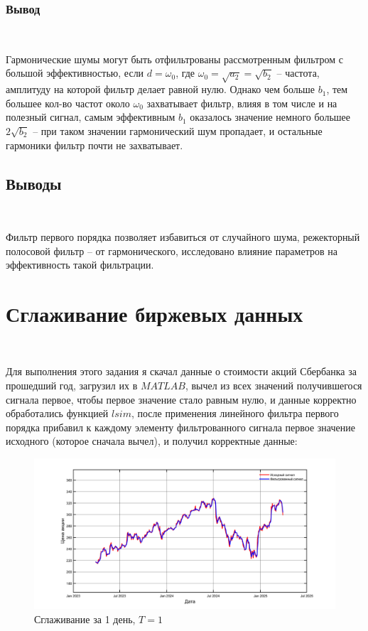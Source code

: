 \documentclass[a4paper]{article}
\begin{document}
\subsubsection{Вывод}\

Гармонические шумы могут быть отфильтрованы рассмотренным фильтром с большой эффективностью, если $d = \omega_0$, где $\omega_0 = \sqrt{a_2} = \sqrt{b_2}$ -- частота, амплитуду на которой фильтр делает равной нулю. Однако чем больше $b_1$, тем большее кол-во частот около $\omega_0$ захватывает фильтр, влияя в том числе и на полезный сигнал, самым эффективным $b_1$ оказалось значение немного большее $2\sqrt{b_2}$ -- при таком значении гармонический шум пропадает, и остальные гармоники фильтр почти не захватывает.

\subsection{Выводы}\

Фильтр первого порядка позволяет избавиться от случайного шума, режекторный полосовой фильтр -- от гармонического, исследовано влияние параметров на эффективность такой фильтрации.

\section{Сглаживание биржевых данных}\

Для выполнения этого задания я скачал данные о стоимости акций Сбербанка за прошедший год, загрузил их в $MATLAB$, вычел из всех значений получившегося сигнала первое, чтобы первое значение стало равным нулю, и данные корректно обработались функцией $lsim$, после применения линейного фильтра первого порядка прибавил к каждому элементу фильтрованного сигнала первое значение исходного (которое сначала вычел), и получил корректные данные:

\begin{figure}[H]
    \centering
    \includegraphics[width=\linewidth]{ex2/1.png}
    \caption{Сглаживание за 1 день, $T = 1$}
\end{figure}
\end{document}
